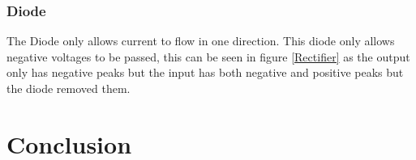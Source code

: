 \documentclass[10pt,a4paper]{article}
\begin{document}
\subsubsection{Diode}
The Diode only allows current to flow in one direction. This diode only allows negative voltages to be passed, this can be seen in figure \ref{Rectifier} as the output only has negative peaks but the input has both negative and positive peaks but the diode removed them.
 

\section{Conclusion}

\printbibliography
\end{document}
